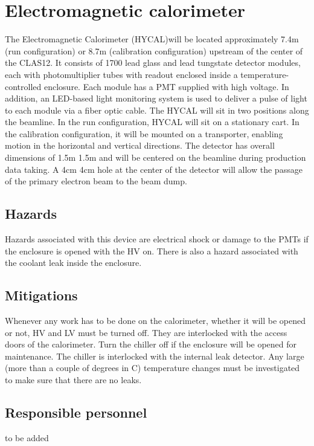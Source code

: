 \section{Electromagnetic calorimeter}

The Electromagnetic Calorimeter (HYCAL)will be located approximately 7.4m (run
configuration) or 8.7m (calibration configuration) upstream of the center of the CLAS12.
It consists of 1700 lead glass and lead tungstate detector modules, each with photomultiplier tubes with readout enclosed inside a temperature-controlled enclosure. Each
module has a PMT supplied with high voltage. In addition, an LED-based light monitoring system is used to deliver a pulse of
light to each module via a fiber optic cable. The HYCAL will sit in two positions along
the beamline. In the run configuration, HYCAL will sit on a stationary cart. In the
calibration configuration, it will be mounted on a transporter, enabling motion in
the horizontal and vertical directions. The detector has overall dimensions of 1.5m 1.5m
and will be centered on the beamline during production data taking. A 4cm 4cm hole
at the center of the detector will allow the passage of the primary electron beam to the
beam dump.  
\subsection{Hazards}
Hazards associated with this device are electrical shock or damage to the PMTs if the enclosure is opened with the HV on. 
There is also a hazard associated with the coolant leak inside the enclosure.
\subsection{Mitigations}
Whenever any work has to be done on the calorimeter, whether it will be opened
or not, HV and LV must be turned off. They are interlocked with the access doors of the calorimeter.
Turn the chiller off if the enclosure will be opened for maintenance. The chiller is interlocked with the internal leak detector.
Any large (more than a couple of degrees in C) temperature changes must be investigated to make
sure that there are no leaks.
\subsection{Responsible personnel}

to be added

